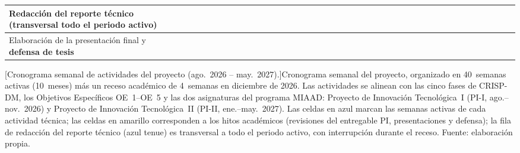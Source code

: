 \documentclass[12pt,letterpaper]{report}
\begin{document}
\begin{landscape}
\begin{minipage}[c][\textheight][c]{\linewidth}
{\begin{tabular}{|>{\raggedright\arraybackslash}p{4.6cm}|*{10}{cccc|}}
        \hline
        \cellcolor{uacjblue!4}Redacción del reporte técnico (transversal todo el periodo activo)
        & \cellcolor{uacjblue!40} & \cellcolor{uacjblue!40} & \cellcolor{uacjblue!40} & \cellcolor{uacjblue!40} & \cellcolor{uacjblue!40} & \cellcolor{uacjblue!40} & \cellcolor{uacjblue!40} & \cellcolor{uacjblue!40} & \cellcolor{uacjblue!40} & \cellcolor{uacjblue!40} & \cellcolor{uacjblue!40} & \cellcolor{uacjblue!40} & \cellcolor{uacjblue!40} & \cellcolor{uacjblue!40} & \cellcolor{uacjblue!40} & \cellcolor{uacjblue!40} &  &  &  &  & \cellcolor{uacjblue!40} & \cellcolor{uacjblue!40} & \cellcolor{uacjblue!40} & \cellcolor{uacjblue!40} & \cellcolor{uacjblue!40} & \cellcolor{uacjblue!40} & \cellcolor{uacjblue!40} & \cellcolor{uacjblue!40} & \cellcolor{uacjblue!40} & \cellcolor{uacjblue!40} & \cellcolor{uacjblue!40} & \cellcolor{uacjblue!40} & \cellcolor{uacjblue!40} & \cellcolor{uacjblue!40} & \cellcolor{uacjblue!40} & \cellcolor{uacjblue!40} & \cellcolor{uacjblue!40} & \cellcolor{uacjblue!40} & \cellcolor{uacjblue!40} &  \\
        \hline
        Elaboración de la presentación final y \textbf{defensa de tesis}
        &  &  &  &  &  &  &  &  &  &  &  &  &  &  &  &  &  &  &  &  &  &  &  &  &  &  &  &  &  &  &  &  &  &  &  &  &  &  &  & \cellcolor{uacjyellow!85} \\
        \hline
    \end{tabular}%
}%
{}
\captionsetup{hypcap=false}%
[Cronograma semanal de actividades del proyecto (ago.~2026 -- may.~2027).]{Cronograma semanal del proyecto, organizado en 40~semanas activas (10~meses) más un receso académico de 4~semanas en diciembre de 2026. Las actividades se alinean con las cinco fases de CRISP-DM, los Objetivos Específicos OE~1--OE~5 y las dos asignaturas del programa MIAAD: Proyecto de Innovación Tecnológica~I (PI-I, ago.--nov.~2026) y Proyecto de Innovación Tecnológica~II (PI-II, ene.--may.~2027). Las celdas en azul marcan las semanas activas de cada actividad técnica; las celdas en amarillo corresponden a los hitos académicos (revisiones del entregable PI, presentaciones y defensa); la fila de redacción del reporte técnico (azul tenue) es transversal a todo el periodo activo, con interrupción durante el receso. Fuente: elaboración propia.}
\label{tab:cronograma_visapredict}
\end{minipage}
\end{landscape}
\end{document}
